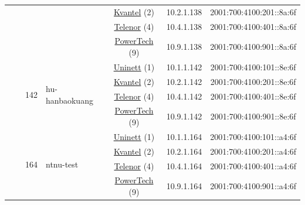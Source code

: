 \begin{small}
\begin{center}
\begin{longtable}{|c|c|c|c|c|c|c|c|}
  &  &  &  & \multicolumn{2}{|c|}{\tiny{\href{http://kvantel.no}{Kvantel} (2)}} & \tiny{10.2.1.138} & \tiny{2001:700:4100:201::8a:6f} \\* \cline{5-5}\cline{6-6}\cline{7-7}\cline{8-8}
  &  &  &  & \multicolumn{2}{|c|}{\tiny{\href{https://www.telenor.no}{Telenor} (4)}} & \tiny{10.4.1.138} & \tiny{2001:700:4100:401::8a:6f} \\* \cline{5-5}\cline{6-6}\cline{7-7}\cline{8-8}
  &  &  &  & \multicolumn{2}{|c|}{\tiny{\href{http://www.powertech.no}{PowerTech} (9)}} & \tiny{10.9.1.138} & \tiny{2001:700:4100:901::8a:6f} \\* \cline{3-3}\cline{4-4}\cline{5-5}\cline{6-6}\cline{7-7}\cline{8-8}
  &  & \multirow{4}{*}{\tiny{142}} & \multicolumn{1}{|l|}{\multirow{4}{*}{\tiny{hu-hanbaokuang}}} & \multicolumn{2}{|c|}{\tiny{\href{https://www.uninett.no}{Uninett} (1)}} & \tiny{10.1.1.142} & \tiny{2001:700:4100:101::8e:6f} \\* \cline{5-5}\cline{6-6}\cline{7-7}\cline{8-8}
  &  &  &  & \multicolumn{2}{|c|}{\tiny{\href{http://kvantel.no}{Kvantel} (2)}} & \tiny{10.2.1.142} & \tiny{2001:700:4100:201::8e:6f} \\* \cline{5-5}\cline{6-6}\cline{7-7}\cline{8-8}
  &  &  &  & \multicolumn{2}{|c|}{\tiny{\href{https://www.telenor.no}{Telenor} (4)}} & \tiny{10.4.1.142} & \tiny{2001:700:4100:401::8e:6f} \\* \cline{5-5}\cline{6-6}\cline{7-7}\cline{8-8}
  &  &  &  & \multicolumn{2}{|c|}{\tiny{\href{http://www.powertech.no}{PowerTech} (9)}} & \tiny{10.9.1.142} & \tiny{2001:700:4100:901::8e:6f} \\* \cline{3-3}\cline{4-4}\cline{5-5}\cline{6-6}\cline{7-7}\cline{8-8}
  &  & \multirow{4}{*}{\tiny{164}} & \multicolumn{1}{|l|}{\multirow{4}{*}{\tiny{ntnu-test}}} & \multicolumn{2}{|c|}{\tiny{\href{https://www.uninett.no}{Uninett} (1)}} & \tiny{10.1.1.164} & \tiny{2001:700:4100:101::a4:6f} \\* \cline{5-5}\cline{6-6}\cline{7-7}\cline{8-8}
  &  &  &  & \multicolumn{2}{|c|}{\tiny{\href{http://kvantel.no}{Kvantel} (2)}} & \tiny{10.2.1.164} & \tiny{2001:700:4100:201::a4:6f} \\* \cline{5-5}\cline{6-6}\cline{7-7}\cline{8-8}
  &  &  &  & \multicolumn{2}{|c|}{\tiny{\href{https://www.telenor.no}{Telenor} (4)}} & \tiny{10.4.1.164} & \tiny{2001:700:4100:401::a4:6f} \\* \cline{5-5}\cline{6-6}\cline{7-7}\cline{8-8}
  &  &  &  & \multicolumn{2}{|c|}{\tiny{\href{http://www.powertech.no}{PowerTech} (9)}} & \tiny{10.9.1.164} & \tiny{2001:700:4100:901::a4:6f} \\* \cline{3-3}\cline{4-4}\cline{5-5}\cline{6-6}\cline{7-7}\cline{8-8}

\end{longtable}
\end{center}
\end{small}
